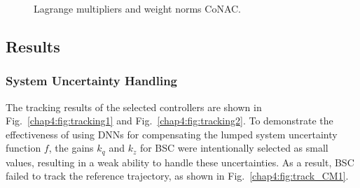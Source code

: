 \begin{figure}[!t]
    \centering
    \vfill
    \caption{Lagrange multipliers and weight norms CoNAC.}
    \label{chap4:fig:weight_multiplier2}
\end{figure}


\subsection{Results}

\subsubsection{System Uncertainty Handling}

The tracking results of the selected controllers are shown in Fig.~\ref{chap4:fig:tracking1} and Fig.~\ref{chap4:fig:tracking2}.
To demonstrate the effectiveness of using DNNs for compensating the lumped system uncertainty function $f$, the gains ${k_q}$ and ${k_z}$ for BSC were intentionally selected as small values, resulting in a weak ability to handle these uncertainties. As a result,
BSC failed to track the reference trajectory, as shown in Fig.~\ref{chap4:fig:track_CM1}.

